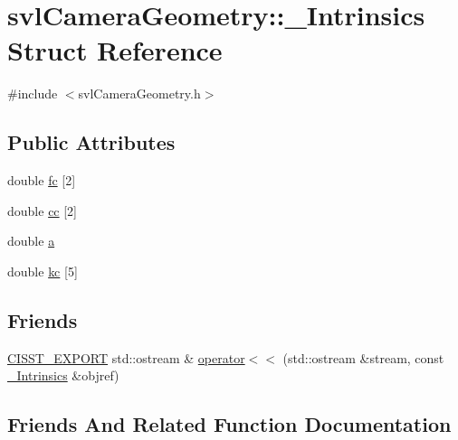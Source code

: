 \hypertarget{structsvl_camera_geometry_1_1___intrinsics}{}\section{svl\+Camera\+Geometry\+:\+:\+\_\+\+Intrinsics Struct Reference}
\label{structsvl_camera_geometry_1_1___intrinsics}


{\ttfamily \#include $<$svl\+Camera\+Geometry.\+h$>$}

\subsection*{Public Attributes}
\begin{DoxyCompactItemize}
\item 
double \hyperlink{structsvl_camera_geometry_1_1___intrinsics_a2f1e1affb6703fb2de4ab27422945147}{fc} \mbox{[}2\mbox{]}
\item 
double \hyperlink{structsvl_camera_geometry_1_1___intrinsics_a5bc8870b1606f4d5c9da2ee4ada62e0d}{cc} \mbox{[}2\mbox{]}
\item 
double \hyperlink{structsvl_camera_geometry_1_1___intrinsics_a5be499added3f5b792cf599759314df1}{a}
\item 
double \hyperlink{structsvl_camera_geometry_1_1___intrinsics_ac898a7e5d9a1062d6073288b38e91492}{kc} \mbox{[}5\mbox{]}
\end{DoxyCompactItemize}
\subsection*{Friends}
\begin{DoxyCompactItemize}
\item 
\hyperlink{cmn_export_macros_8h_a99393e0c3ac434b2605235bbe20684f8}{C\+I\+S\+S\+T\+\_\+\+E\+X\+P\+O\+R\+T} std\+::ostream \& \hyperlink{structsvl_camera_geometry_1_1___intrinsics_ae98709c28a24803b20961ac4e8cad0ee}{operator$<$$<$} (std\+::ostream \&stream, const \hyperlink{structsvl_camera_geometry_1_1___intrinsics}{\+\_\+\+Intrinsics} \&objref)
\end{DoxyCompactItemize}


\subsection{Friends And Related Function Documentation}
\hypertarget{structsvl_camera_geometry_1_1___intrinsics_ae98709c28a24803b20961ac4e8cad0ee}{}

